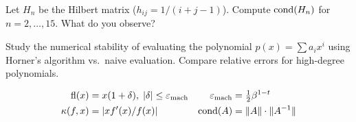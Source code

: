 \begin{exercise}
Let $H_n$ be the Hilbert matrix ($h_{ij}=1/(i+j-1)$). Compute $\mathrm{cond}(H_n)$ for $n=2,\ldots,15$. What do you observe?
\end{exercise}

\begin{exercise}
Study the numerical stability of evaluating the polynomial $p(x)=\sum a_ix^i$ using Horner's algorithm vs.\ naive evaluation. Compare relative errors for high-degree polynomials.
\end{exercise}

\begin{keyformulas}
\begin{align*}
\mathrm{fl}(x) &= x(1+\delta),\;|\delta|\leq\varepsilon_{\mathrm{mach}} &
\varepsilon_{\mathrm{mach}} &= \tfrac{1}{2}\beta^{1-t} \\
\kappa(f,x) &= |xf'(x)/f(x)| &
\mathrm{cond}(A) &= \|A\|\cdot\|A^{-1}\|
\end{align*}
\end{keyformulas}
